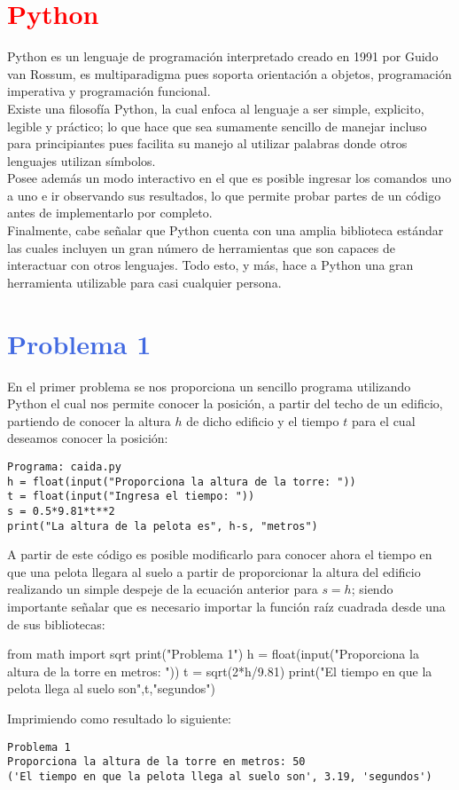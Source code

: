 \documentclass[12pt]{article}
\begin{document}
\section*{\textcolor{Red}{Python}}
Python\cite{1} es un lenguaje de programación interpretado creado en 1991 por Guido van Rossum, es multiparadigma pues soporta orientación a objetos, programación imperativa y programación funcional.\\
Existe una filosofía Python, la cual enfoca al lenguaje a ser simple, explicito, legible y práctico; lo que hace que sea sumamente sencillo de manejar incluso para principiantes pues facilita su manejo al utilizar palabras donde otros lenguajes utilizan símbolos.\\
Posee además un modo interactivo en el que es posible ingresar los comandos uno a uno e ir observando sus resultados, lo que permite probar partes de un código antes de implementarlo por completo.\\
Finalmente, cabe señalar que Python cuenta con una amplia biblioteca estándar las cuales incluyen un gran número de herramientas que son capaces de interactuar con otros lenguajes. Todo esto, y más, hace a Python una gran herramienta utilizable para casi cualquier persona.
\pagebreak
\section*{\textcolor{RoyalBlue}{Problema 1}}
En el primer problema se nos proporciona un sencillo programa utilizando Python el cual nos permite conocer la posición, a partir del techo de un edificio, partiendo de conocer la altura $h$ de dicho edificio y el tiempo $t$ para el cual deseamos conocer la posición:
\begin{verbatim}
Programa: caida.py
h = float(input("Proporciona la altura de la torre: "))
t = float(input("Ingresa el tiempo: "))
s = 0.5*9.81*t**2
print("La altura de la pelota es", h-s, "metros")
\end{verbatim}

A partir de este código es posible modificarlo para conocer ahora el tiempo en que una pelota llegara al suelo a partir de proporcionar la altura del edificio realizando un simple despeje de la ecuación anterior para $s = h$; siendo importante señalar que es necesario importar la función raíz cuadrada desde una de sus bibliotecas:

\begin{center}
\begin{boxedverbatim} 
 from math import sqrt
 print("Problema 1")
 h = float(input("Proporciona la altura de la torre en metros: "))
 t = sqrt(2*h/9.81)
 print("El tiempo en que la pelota llega al suelo son",t,"segundos")
\end{boxedverbatim} 
\end{center}
Imprimiendo como resultado lo siguiente:
\begin{center}
\begin{verbatim}
Problema 1
Proporciona la altura de la torre en metros: 50
('El tiempo en que la pelota llega al suelo son', 3.19, 'segundos')
\end{verbatim}
\end{center}
\pagebreak
\end{document}
